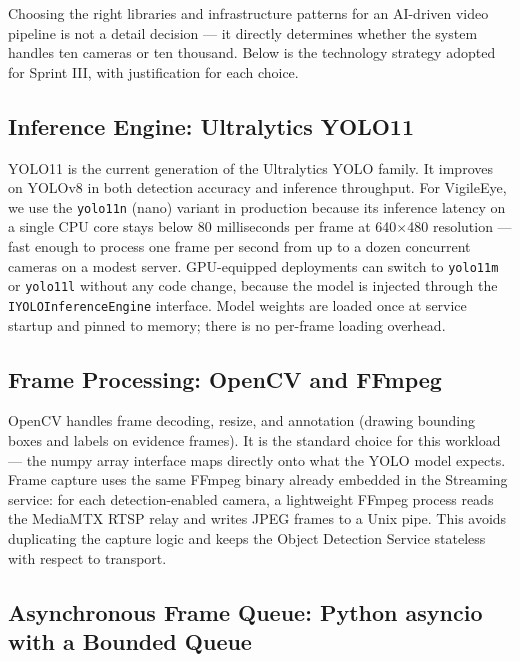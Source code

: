 \hspace{0.8cm}Choosing the right libraries and infrastructure patterns for an AI-driven video pipeline is not a detail decision --- it directly determines whether the system handles ten cameras or ten thousand. Below is the technology strategy adopted for Sprint III, with justification for each choice.

\subsection{Inference Engine: Ultralytics YOLO11}
\label{subsec:s3_yolo}

\hspace{0.8cm}YOLO11 is the current generation of the Ultralytics YOLO family. It improves on YOLOv8 in both detection accuracy and inference throughput. For VigileEye, we use the \texttt{yolo11n} (nano) variant in production because its inference latency on a single CPU core stays below 80 milliseconds per frame at 640$\times$480 resolution --- fast enough to process one frame per second from up to a dozen concurrent cameras on a modest server. GPU-equipped deployments can switch to \texttt{yolo11m} or \texttt{yolo11l} without any code change, because the model is injected through the \texttt{IYOLOInferenceEngine} interface. Model weights are loaded once at service startup and pinned to memory; there is no per-frame loading overhead.

\subsection{Frame Processing: OpenCV and FFmpeg}
\label{subsec:s3_opencv}

\hspace{0.8cm}OpenCV handles frame decoding, resize, and annotation (drawing bounding boxes and labels on evidence frames). It is the standard choice for this workload --- the numpy array interface maps directly onto what the YOLO model expects. Frame capture uses the same FFmpeg binary already embedded in the Streaming service: for each detection-enabled camera, a lightweight FFmpeg process reads the MediaMTX RTSP relay and writes JPEG frames to a Unix pipe. This avoids duplicating the capture logic and keeps the Object Detection Service stateless with respect to transport.

\subsection{Asynchronous Frame Queue: Python asyncio with a Bounded Queue}
\label{subsec:s3_async}


